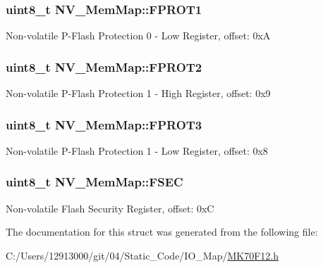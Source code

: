 \subsubsection[{F\+P\+R\+O\+T1}]{\setlength{\rightskip}{0pt plus 5cm}uint8\+\_\+t N\+V\+\_\+\+Mem\+Map\+::\+F\+P\+R\+O\+T1}\label{struct_n_v___mem_map_a87204afdff32b371c03caafdf5a07b69}
Non-\/volatile P-\/\+Flash Protection 0 -\/ Low Register, offset\+: 0x\+A \hypertarget{struct_n_v___mem_map_aace11e44cee29095fe7c0bf683039f57}{}
\subsubsection[{F\+P\+R\+O\+T2}]{\setlength{\rightskip}{0pt plus 5cm}uint8\+\_\+t N\+V\+\_\+\+Mem\+Map\+::\+F\+P\+R\+O\+T2}\label{struct_n_v___mem_map_aace11e44cee29095fe7c0bf683039f57}
Non-\/volatile P-\/\+Flash Protection 1 -\/ High Register, offset\+: 0x9 \hypertarget{struct_n_v___mem_map_a944089b14b23cff0b4f8a16e13f8b9d6}{}
\subsubsection[{F\+P\+R\+O\+T3}]{\setlength{\rightskip}{0pt plus 5cm}uint8\+\_\+t N\+V\+\_\+\+Mem\+Map\+::\+F\+P\+R\+O\+T3}\label{struct_n_v___mem_map_a944089b14b23cff0b4f8a16e13f8b9d6}
Non-\/volatile P-\/\+Flash Protection 1 -\/ Low Register, offset\+: 0x8 \hypertarget{struct_n_v___mem_map_acb89fbc884fb10887ef063d1aa892b29}{}
\subsubsection[{F\+S\+E\+C}]{\setlength{\rightskip}{0pt plus 5cm}uint8\+\_\+t N\+V\+\_\+\+Mem\+Map\+::\+F\+S\+E\+C}\label{struct_n_v___mem_map_acb89fbc884fb10887ef063d1aa892b29}
Non-\/volatile Flash Security Register, offset\+: 0x\+C 

The documentation for this struct was generated from the following file\+:\begin{DoxyCompactItemize}
\item 
C\+:/\+Users/12913000/git/04/\+Static\+\_\+\+Code/\+I\+O\+\_\+\+Map/\hyperlink{_m_k70_f12_8h}{M\+K70\+F12.\+h}\end{DoxyCompactItemize}
